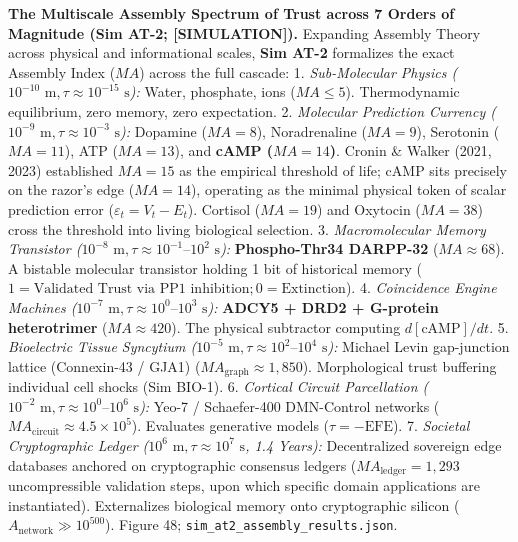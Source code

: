 \documentclass[
]{article}
\begin{document}
\textbf{The Multiscale Assembly Spectrum of Trust across 7 Orders of
Magnitude (Sim AT-2; {[}SIMULATION{]}).} Expanding Assembly Theory
across physical and informational scales, \textbf{Sim AT-2} formalizes
the exact Assembly Index (\(MA\)) across the full cascade: 1.
\emph{Sub-Molecular Physics
(\(10^{-10}\text{ m}, \tau \approx 10^{-15}\text{ s}\)):} Water,
phosphate, ions (\(MA \le 5\)). Thermodynamic equilibrium, zero memory,
zero expectation. 2. \emph{Molecular Prediction Currency
(\(10^{-9}\text{ m}, \tau \approx 10^{-3}\text{ s}\)):} Dopamine
(\(MA = 8\)), Noradrenaline (\(MA = 9\)), Serotonin (\(MA = 11\)), ATP
(\(MA = 13\)), and \textbf{cAMP (\(MA = 14\))}. Cronin \& Walker (2021,
2023) established \(MA = 15\) as the empirical threshold of life; cAMP
sits precisely on the razor's edge (\(MA = 14\)), operating as the
minimal physical token of scalar prediction error
(\(\varepsilon_t = V_t - E_t\)). Cortisol (\(MA = 19\)) and Oxytocin
(\(MA = 38\)) cross the threshold into living biological selection. 3.
\emph{Macromolecular Memory Transistor
(\(10^{-8}\text{ m}, \tau \approx 10^{-1}\text{–}10^2\text{ s}\)):}
\textbf{Phospho-Thr34 DARPP-32} (\(MA \approx 68\)). A bistable
molecular transistor holding 1 bit of historical memory
(\(1 = \text{Validated Trust via PP1 inhibition}; 0 = \text{Extinction}\)).
4. \emph{Coincidence Engine Machines
(\(10^{-7}\text{ m}, \tau \approx 10^0\text{–}10^3\text{ s}\)):}
\textbf{ADCY5 + DRD2 + G-protein heterotrimer} (\(MA \approx 420\)). The
physical subtractor computing \(d[\text{cAMP}]/dt\). 5.
\emph{Bioelectric Tissue Syncytium
(\(10^{-5}\text{ m}, \tau \approx 10^2\text{–}10^4\text{ s}\)):} Michael
Levin gap-junction lattice (Connexin-43 / GJA1)
(\(MA_{\text{graph}} \approx 1,850\)). Morphological trust buffering
individual cell shocks (Sim BIO-1). 6. \emph{Cortical Circuit
Parcellation
(\(10^{-2}\text{ m}, \tau \approx 10^0\text{–}10^6\text{ s}\)):} Yeo-7 /
Schaefer-400 DMN-Control networks
(\(MA_{\text{circuit}} \approx 4.5 \times 10^5\)). Evaluates generative
models (\(\tau = -\text{EFE}\)). 7. \emph{Societal Cryptographic Ledger
(\(10^6\text{ m}, \tau \approx 10^7\text{ s}\), 1.4 Years):}
Decentralized sovereign edge databases anchored on cryptographic
consensus ledgers (\(MA_{\text{ledger}} = 1,293\) uncompressible
validation steps, upon which specific domain applications are
instantiated). Externalizes biological memory onto cryptographic silicon
(\(A_{\text{network}} \gg 10^{500}\)). Figure 48;
\texttt{sim\_at2\_assembly\_results.json}.
\end{document}
